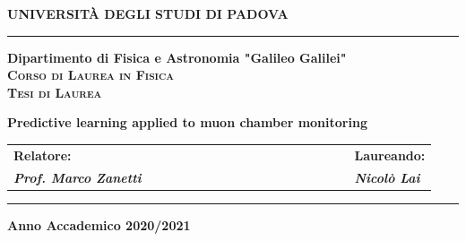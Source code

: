 \begin{titlepage}
    \begin{center}
        {{\huge{\textsc{\bf UNIVERSITÀ DEGLI STUDI DI PADOVA}}}\\}
        \vspace{5mm}
        \hrule
        \vspace{5mm}
        {\Large{\bf Dipartimento di Fisica e Astronomia "Galileo Galilei"}} \\
        \vspace{5mm}
        {\Large{\textsc{\bf Corso di Laurea in Fisica}}}\\
        \vspace{20mm}
        {\Large{\textsc{\bf Tesi di Laurea}}}\\
        \vspace{20mm}
        \begin{spacing}{2}
            {\LARGE \textbf{Predictive learning applied to muon chamber monitoring}}\\
        \end{spacing}
        \vspace{8mm}
    \end{center}


    \vspace{10mm}


    \begin{spacing}{2}
        \begin{tabular}{ l  c  c c c  cccccccc c c c  c  l }
            {\Large{\bf Relatore:}} &&&&&&&&&&&&&&&&& {\Large{\bf Laureando:}}\\
            {\Large{\bf \textit{Prof. Marco Zanetti}}} &&&&&&&&&&&&&&&&& {\Large{\bf \textit{Nicolò Lai}}}\\
        \end{tabular}
    \end{spacing}


    \vspace{15 mm}
    \vspace*{\fill}
    \hrule


    \begin{center}
        {\Large{\bf Anno Accademico 2020/2021}}
    \end{center}


\end{titlepage}